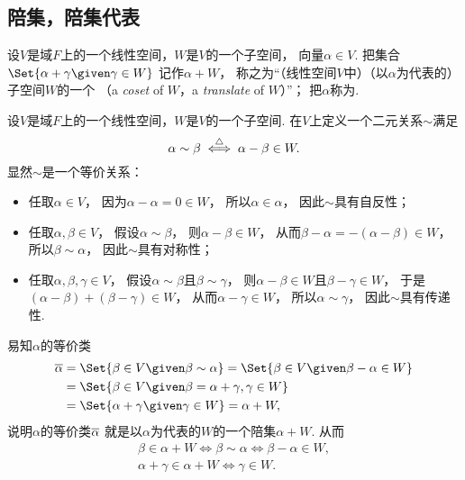 \subsection{陪集，陪集代表}
\begin{definition}
设\(V\)是域\(F\)上的一个线性空间，\(W\)是\(V\)的一个子空间，
向量\(\alpha \in V\).
把集合\(\Set{ \alpha + \gamma \given \gamma \in W }\)
记作\(\alpha+W\)，
称之为“（线性空间\(V\)中）（以\(\alpha\)为代表的）子空间\(W\)的一个%
（a \emph{coset} of \(W\)，a \emph{translate} of \(W\)）”；
把\(\alpha\)称为.
\end{definition}

设\(V\)是域\(F\)上的一个线性空间，\(W\)是\(V\)的一个子空间.
在\(V\)上定义一个二元关系\(\sim\)满足\begin{equation*}
	\alpha\sim\beta
	\overset{\triangle}{\iff}
	\alpha-\beta\in W.
\end{equation*}
显然\(\sim\)是一个等价关系：\begin{itemize}
	\item 任取\(\alpha \in V\)，
	因为\(\alpha - \alpha = 0 \in W\)，
	所以\(\alpha \in \alpha\)，
	因此\(\sim\)具有自反性；
	\item 任取\(\alpha,\beta \in V\)，
	假设\(\alpha \sim \beta\)，
	则\(\alpha - \beta \in W\)，
	从而\(\beta - \alpha = - (\alpha - \beta) \in W\)，
	所以\(\beta \sim \alpha\)，
	因此\(\sim\)具有对称性；
	\item 任取\(\alpha,\beta,\gamma \in V\)，
	假设\(\alpha \sim \beta\)且\(\beta \sim \gamma\)，
	则\(\alpha - \beta \in W\)且\(\beta - \gamma \in W\)，
	于是\(
		(\alpha - \beta)	\allowbreak
		+					\allowbreak
		(\beta - \gamma)	\allowbreak
		\in W
	\)，
	从而\(\alpha - \gamma \in W\)，
	所以\(\alpha \sim \gamma\)，
	因此\(\sim\)具有传递性.
\end{itemize}
易知\(\alpha\)的等价类\begin{align*}
	\EquivalenceClassO{\alpha}
	&= \Set{ \beta \in V \given \beta \sim \alpha }
	= \Set{ \beta \in V \given \beta - \alpha \in W } \\
	&= \Set{ \beta \in V \given \beta = \alpha + \gamma, \gamma \in W } \\
	&= \Set{ \alpha+\gamma \given \gamma \in W }
	= \alpha+W,
\end{align*}
说明\(\alpha\)的等价类\(\EquivalenceClassO{\alpha}\)
就是以\(\alpha\)为代表的\(W\)的一个陪集\(\alpha+W\).
从而\begin{gather*}
	\beta \in \alpha + W
	\iff
	\beta \sim \alpha
	\iff
	\beta - \alpha \in W, \\
	\alpha + \gamma \in \alpha + W
	\iff
	\gamma \in W.
\end{gather*}


